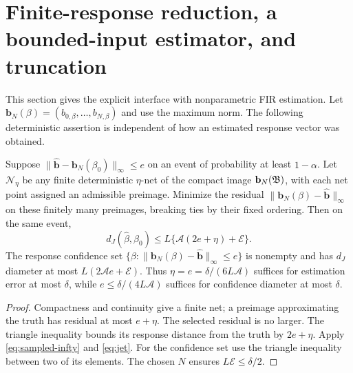 \section{Finite-response reduction, a bounded-input estimator, and truncation}
\label{sec:transfer}
This section gives the explicit interface with nonparametric FIR estimation.
Let $\mathbf b_N(\beta)=(b_{0,\beta},\ldots,b_{N,\beta})$ and use the
maximum norm. The following deterministic assertion is independent of how
an estimated response vector was obtained.

\begin{theorem}
\label{thm:transfer}
Suppose $\|\widehat{\mathbf b}-\mathbf b_N(\beta_0)\|_\infty\le e$ on an
event of probability at least $1-\alpha$. Let $\mathcal N_\eta$ be any
finite deterministic $\eta$-net of the compact image $\mathbf b_N(\mathfrak B)$,
with each net point assigned an admissible preimage. Minimize the residual
$\|\mathbf b_N(\beta)-\widehat{\mathbf b}\|_\infty$ on these finitely many
preimages, breaking ties by their fixed ordering. Then on the same event,
\begin{equation}
 d_J(\widehat\beta,\beta_0)
 \le L\{\mathcal A(2e+\eta)+\mathcal E\}.
 \label{eq:FIR-transfer}
\end{equation}
The response confidence set
$\{\beta:\|\mathbf b_N(\beta)-\widehat{\mathbf b}\|_\infty\le e\}$
is nonempty and has $d_J$ diameter at most $L(2\mathcal A e+\mathcal E)$.
Thus $\eta=e=\delta/(6L\mathcal A)$ suffices for estimation error at most
$\delta$, while $e\le\delta/(4L\mathcal A)$ suffices for confidence diameter
at most $\delta$.
\end{theorem}
\begin{proof}
Compactness and continuity give a finite net; a preimage approximating the
truth has residual at most $e+\eta$. The selected residual is no larger.
The triangle inequality bounds its response distance from the truth by
$2e+\eta$. Apply \eqref{eq:sampled-infty} and \eqref{eq:jet}. For the
confidence set use the triangle inequality between two of its elements.
The chosen $N$ ensures $L\mathcal E\le\delta/2$.
\end{proof}

